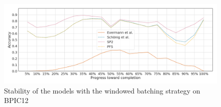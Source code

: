 \begin{figure}[!htb]
    \centering
    \includegraphics[width=\textwidth]{gfx/bpic2012/windowed_stability.png}
    \caption{Stability of the models with the windowed batching strategy on BPIC12}
    \label{fig:bpic12-windowed-stability}
\end{figure}
\FloatBarrier

